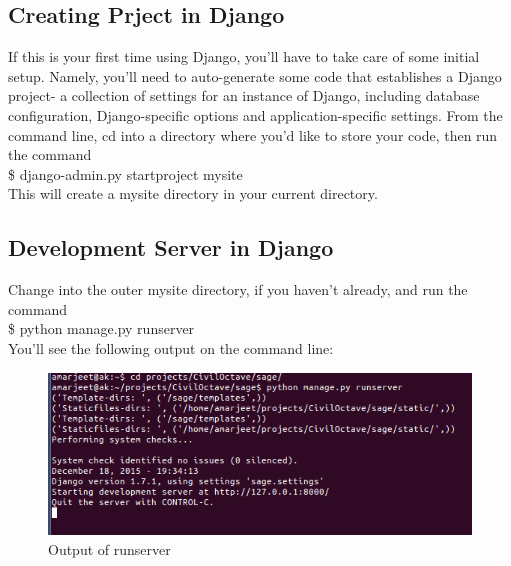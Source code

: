 \subsection{Creating Prject in Django}
If this is your first time using Django, you'll have to take care of 
some initial setup. Namely, you'll need to auto-generate some code that 
establishes a Django project- a collection of settings for an instance 
of Django, including database configuration, Django-specific options 
and application-specific settings. From the command line, cd into a 
directory where you'd like to store your code, then run the command \\

	\$ django-admin.py startproject mysite \\

\noindent This will create a mysite directory in your current
directory.


\subsection{Development Server in Django}  Change into 
the outer mysite directory, if you haven't already, and run the command\\
	
	\$ python manage.py runserver\\

You'll see the following output on the command line:\\

\begin{figure}[h]
\centering \includegraphics[scale=0.5]{images/out.png}
\caption{Output of runserver}
\end{figure}

